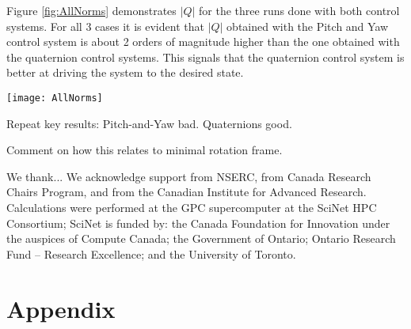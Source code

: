 \documentclass[aps, prd, amsmath, floats, floatfix, twocolumn,superscriptaddress, nofootinbib, showpacs]{revtex4-1}
\theoremstyle{plain}
\theoremstyle{definition}
\begin{document}
Figure \ref{fig:AllNorms} demonstrates $|Q|$ for the three runs done with both
control systems. For all 3 cases it is evident that $|Q|$ obtained with the
Pitch and Yaw control system is about 2 orders of magnitude higher than the one
obtained with the quaternion control systems. This signals that the quaternion
control system is better at driving the system to the desired state. 

\begin{figure*}[!htbp]
  \texttt{[image: AllNorms]}
  \caption{Three full NR simulations performed with both control systems. The time is measured in units of initial orbital period. }
  \label{fig:AllNorms}
\end{figure*}



Repeat key results:  Pitch-and-Yaw bad. Quaternions good.

Comment on how this relates to minimal rotation frame. 

\acknowledgements

We thank... We acknowledge support from NSERC, from Canada Research
Chairs Program, and from the Canadian Institute for Advanced Research.
Calculations were performed at the GPC supercomputer at the SciNet HPC
Consortium; SciNet is funded by: the Canada Foundation for Innovation
under the auspices of Compute Canada; the Government of Ontario;
Ontario Research Fund -- Research Excellence; and the University of
Toronto.




\section*{Appendix}
\end{document}
